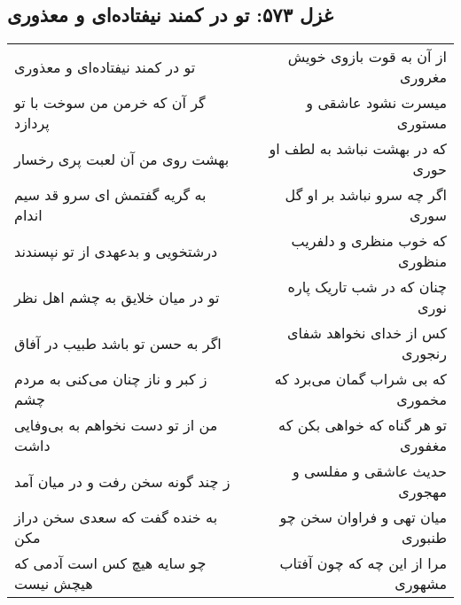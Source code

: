 \begin{center}
\section*{غزل ۵۷۳: تو در کمند نیفتاده‌ای و معذوری}
\label{sec:573}
\begin{longtable}{l p{0.5cm} r}
تو در کمند نیفتاده‌ای و معذوری
&&
از آن به قوت بازوی خویش مغروری
\\
گر آن که خرمن من سوخت با تو پردازد
&&
میسرت نشود عاشقی و مستوری
\\
بهشت روی من آن لعبت پری رخسار
&&
که در بهشت نباشد به لطف او حوری
\\
به گریه گفتمش ای سرو قد سیم اندام
&&
اگر چه سرو نباشد بر او گل سوری
\\
درشتخویی و بدعهدی از تو نپسندند
&&
که خوب منظری و دلفریب منظوری
\\
تو در میان خلایق به چشم اهل نظر
&&
چنان که در شب تاریک پاره نوری
\\
اگر به حسن تو باشد طبیب در آفاق
&&
کس از خدای نخواهد شفای رنجوری
\\
ز کبر و ناز چنان می‌کنی به مردم چشم
&&
که بی شراب گمان می‌برد که مخموری
\\
من از تو دست نخواهم به بی‌وفایی داشت
&&
تو هر گناه که خواهی بکن که مغفوری
\\
ز چند گونه سخن رفت و در میان آمد
&&
حدیث عاشقی و مفلسی و مهجوری
\\
به خنده گفت که سعدی سخن دراز مکن
&&
میان تهی و فراوان سخن چو طنبوری
\\
چو سایه هیچ کس است آدمی که هیچش نیست
&&
مرا از این چه که چون آفتاب مشهوری
\\
\end{longtable}
\end{center}
